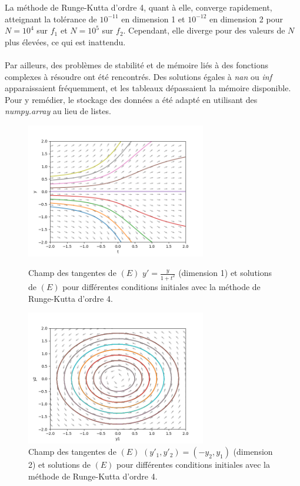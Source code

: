 \documentclass{article}
\begin{document}
La méthode de Runge-Kutta d'ordre 4, quant à elle, converge rapidement, atteignant la tolérance de \(10^{-11}\) en dimension 1 et \(10^{-12}\) en dimension 2 pour \(N = 10^4\) sur \(f_1\) et \(N = 10^5\) sur \(f_2\). Cependant, elle diverge pour des valeurs de \(N\) plus élevées, ce qui est inattendu.\\ \\
Par ailleurs, des problèmes de stabilité et de mémoire liés à des fonctions complexes à résoudre ont été rencontrés. Des solutions égales à \textit{nan} ou \textit{inf} apparaissaient fréquemment, et les tableaux dépassaient la mémoire disponible. Pour y remédier, le stockage des données a été adapté en utilisant des \textit{numpy.array} au lieu de listes.
\begin{figure}[H]
  \centering
  \begin{minipage}{0.48\textwidth}
    \centering
    \includegraphics[width=0.7\textwidth]{img/cauchy_on_tan_field_f_1_runge_kutta_4.png}
    \caption{Champ des tangentes de $(E)$ $y' = \frac{y}{1 + t^2}$ (dimension 1) et solutions de $(E)$ pour différentes conditions initiales avec la méthode de Runge-Kutta d'ordre 4.}
    \label{fig:cauchy_on_tan_field_f_1_runge_kutta_4}
  \end{minipage}
  \hfill
  \begin{minipage}{0.48\textwidth}
    \centering
    \includegraphics[width=0.7\textwidth]{img/cauchy_on_tan_field_f_2_runge_kutta_4.png}
    \caption{Champ des tangentes de $(E)$  $(y'_1, y'_2) = (-y_2, y_1)$ (dimension 2) et solutions de $(E)$ pour différentes conditions initiales avec la méthode de Runge-Kutta d'ordre 4.}
    \label{fig:cauchy_on_tan_field_f_2_runge_kutta_4}
  \end{minipage}
\end{figure}
\end{document}
